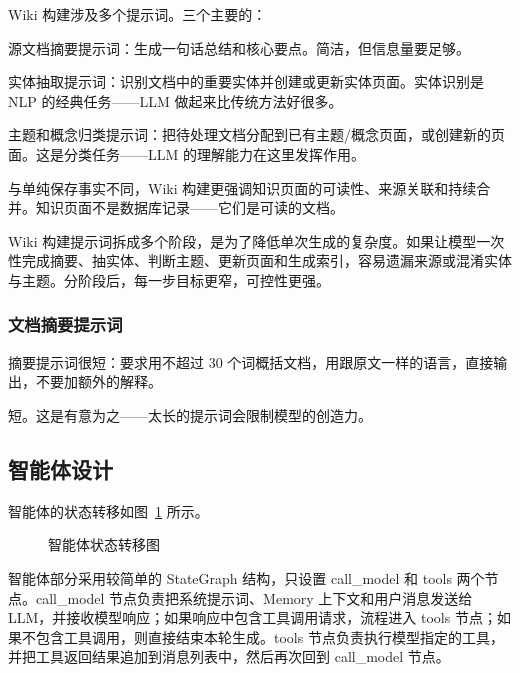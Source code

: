 Wiki 构建涉及多个提示词。三个主要的：

源文档摘要提示词：生成一句话总结和核心要点。简洁，但信息量要足够。

实体抽取提示词：识别文档中的重要实体并创建或更新实体页面。实体识别是 NLP 的经典任务——LLM 做起来比传统方法好很多。

主题和概念归类提示词：把待处理文档分配到已有主题/概念页面，或创建新的页面。这是分类任务——LLM 的理解能力在这里发挥作用。

与单纯保存事实不同，Wiki 构建更强调知识页面的可读性、来源关联和持续合并。知识页面不是数据库记录——它们是可读的文档。

Wiki 构建提示词拆成多个阶段，是为了降低单次生成的复杂度。如果让模型一次性完成摘要、抽实体、判断主题、更新页面和生成索引，容易遗漏来源或混淆实体与主题。分阶段后，每一步目标更窄，可控性更强。

\subsubsection{文档摘要提示词}

摘要提示词很短：要求用不超过 30 个词概括文档，用跟原文一样的语言，直接输出，不要加额外的解释。

短。这是有意为之——太长的提示词会限制模型的创造力。

\subsection{智能体设计}

智能体的状态转移如图~\ref{F.agent_graph} 所示。

\begin{figure}[htb]
  \centering
  \caption{智能体状态转移图}
  \label{F.agent_graph}
\end{figure}

智能体部分采用较简单的 StateGraph 结构，只设置 call\_model 和 tools 两个节点。call\_model 节点负责把系统提示词、Memory 上下文和用户消息发送给 LLM，并接收模型响应；如果响应中包含工具调用请求，流程进入 tools 节点；如果不包含工具调用，则直接结束本轮生成。tools 节点负责执行模型指定的工具，并把工具返回结果追加到消息列表中，然后再次回到 call\_model 节点。

